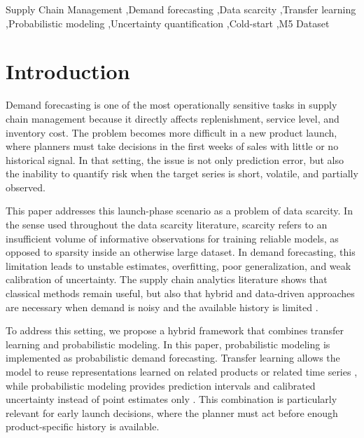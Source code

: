 \documentclass[3p,times,procedia]{elsarticle}
\begin{document}
\begin{frontmatter}
\begin{keyword}
Supply Chain Management \sep Demand forecasting \sep Data scarcity \sep Transfer learning \sep Probabilistic modeling \sep Uncertainty quantification \sep Cold-start \sep M5 Dataset




\end{keyword}
\end{frontmatter}



\section{Introduction}
\label{intro}

Demand forecasting is one of the most operationally sensitive tasks in supply chain management because it directly affects replenishment, service level, and inventory cost. The problem becomes more difficult in a new product launch, where planners must take decisions in the first weeks of sales with little or no historical signal. In that setting, the issue is not only prediction error, but also the inability to quantify risk when the target series is short, volatile, and partially observed.

This paper addresses this launch-phase scenario as a problem of data scarcity. In the sense used throughout the data scarcity literature, scarcity refers to an insufficient volume of informative observations for training reliable models, as opposed to sparsity inside an otherwise large dataset. In demand forecasting, this limitation leads to unstable estimates, overfitting, poor generalization, and weak calibration of uncertainty. The supply chain analytics literature shows that classical methods remain useful, but also that hybrid and data-driven approaches are necessary when demand is noisy and the available history is limited \cite{Seyedan2020}.

To address this setting, we propose a hybrid framework that combines transfer learning and probabilistic modeling. In this paper, probabilistic modeling is implemented as probabilistic demand forecasting. Transfer learning allows the model to reuse representations learned on related products or related time series \cite{Weber2021,Fawaz2018}, while probabilistic modeling provides prediction intervals and calibrated uncertainty instead of point estimates only \cite{Xu2019,Jiang2019}. This combination is particularly relevant for early launch decisions, where the planner must act before enough product-specific history is available.
\end{document}
